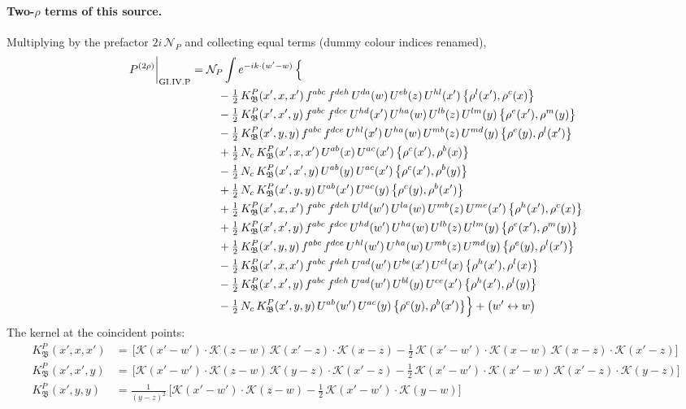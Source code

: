 \documentclass[10pt]{article}
\numberwithin{equation}{section}
\newcommand{\KK}{\mathcal K}
\newcommand{\NP}{\mathcal N_{P}}
\begin{document}
\paragraph{Two-$\rho$ terms of this source.} Multiplying by the prefactor $2i\,\NP$ and collecting equal terms (dummy colour indices renamed),
\begin{align}
P^{(2\rho)}\bigg|_{\rm GI.IV.P}={}&\NP\int e^{-ik\cdot(w'-w)}\,\Big\{\notag\\
&\quad -\tfrac12\,K^{P}_{\mathfrak B}(x',x,x')\,f^{abc}\,f^{deh}\,U^{da}(w)\,U^{eb}(z)\,U^{hl}(x')\,\big\{\rho^{l}(x'),\rho^{c}(x)\big\}\notag\\
&\quad -\tfrac12\,K^{P}_{\mathfrak B}(x',x',y)\,f^{abc}\,f^{dce}\,U^{hd}(x')\,U^{ha}(w)\,U^{lb}(z)\,U^{lm}(y)\,\big\{\rho^{e}(x'),\rho^{m}(y)\big\}\notag\\
&\quad -\tfrac12\,K^{P}_{\mathfrak B}(x',y,y)\,f^{abc}\,f^{dce}\,U^{hl}(x')\,U^{ha}(w)\,U^{mb}(z)\,U^{md}(y)\,\big\{\rho^{e}(y),\rho^{l}(x')\big\}\notag\\
&\quad +\tfrac12\,N_{c}\,K^{P}_{\mathfrak B}(x',x,x')\,U^{ab}(x)\,U^{ac}(x')\,\big\{\rho^{c}(x'),\rho^{b}(x)\big\}\notag\\
&\quad -\tfrac12\,N_{c}\,K^{P}_{\mathfrak B}(x',x',y)\,U^{ab}(y)\,U^{ac}(x')\,\big\{\rho^{c}(x'),\rho^{b}(y)\big\}\notag\\
&\quad +\tfrac12\,N_{c}\,K^{P}_{\mathfrak B}(x',y,y)\,U^{ab}(x')\,U^{ac}(y)\,\big\{\rho^{c}(y),\rho^{b}(x')\big\}\notag\\
&\quad +\tfrac12\,K^{P}_{\mathfrak B}(x',x,x')\,f^{abc}\,f^{deh}\,U^{ld}(w')\,U^{la}(w)\,U^{mb}(z)\,U^{me}(x')\,\big\{\rho^{h}(x'),\rho^{c}(x)\big\}\notag\\
&\quad +\tfrac12\,K^{P}_{\mathfrak B}(x',x',y)\,f^{abc}\,f^{dce}\,U^{hd}(w')\,U^{ha}(w)\,U^{lb}(z)\,U^{lm}(y)\,\big\{\rho^{e}(x'),\rho^{m}(y)\big\}\notag\\
&\quad +\tfrac12\,K^{P}_{\mathfrak B}(x',y,y)\,f^{abc}\,f^{dce}\,U^{hl}(w')\,U^{ha}(w)\,U^{mb}(z)\,U^{md}(y)\,\big\{\rho^{e}(y),\rho^{l}(x')\big\}\notag\\
&\quad -\tfrac12\,K^{P}_{\mathfrak B}(x',x,x')\,f^{abc}\,f^{deh}\,U^{ad}(w')\,U^{be}(x')\,U^{cl}(x)\,\big\{\rho^{h}(x'),\rho^{l}(x)\big\}\notag\\
&\quad -\tfrac12\,K^{P}_{\mathfrak B}(x',x',y)\,f^{abc}\,f^{deh}\,U^{ad}(w')\,U^{bl}(y)\,U^{ce}(x')\,\big\{\rho^{h}(x'),\rho^{l}(y)\big\}\notag\\
&\quad -\tfrac12\,N_{c}\,K^{P}_{\mathfrak B}(x',y,y)\,U^{ab}(w')\,U^{ac}(y)\,\big\{\rho^{c}(y),\rho^{b}(x')\big\}\Big\}+\big(w'\leftrightarrow w\big)\label{B:eq:res-GI.IV.P}
\end{align}
The kernel at the coincident points:
\begin{align*}
K^{P}_{\mathfrak B}(x',x,x')&=\,\Big[\KK(x'-w')\cdot\KK(z-w)\,\KK(x'-z)\cdot\KK(x-z)-\frac{1}{2}\,\KK(x'-w')\cdot\KK(x-w)\,\KK(x-z)\cdot\KK(x'-z)\Big]\\K^{P}_{\mathfrak B}(x',x',y)&=\,\Big[\KK(x'-w')\cdot\KK(z-w)\,\KK(y-z)\cdot\KK(x'-z)-\frac{1}{2}\,\KK(x'-w')\cdot\KK(x'-w)\,\KK(x'-z)\cdot\KK(y-z)\Big]\\K^{P}_{\mathfrak B}(x',y,y)&=\frac{1}{(y-z)^2}\,\Big[\KK(x'-w')\cdot\KK(z-w)-\frac{1}{2}\,\KK(x'-w')\cdot\KK(y-w)\Big]
\end{align*}
\end{document}
